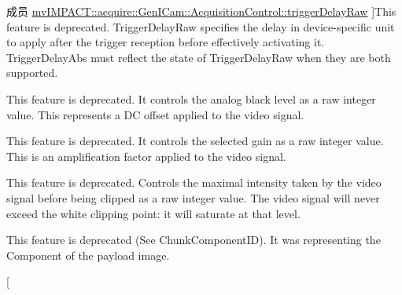 \begin{DoxyRefList}
\hypertarget{deprecated__deprecated000045}{}%
成员 \hyperlink{classmv_i_m_p_a_c_t_1_1acquire_1_1_gen_i_cam_1_1_acquisition_control_ad96d0a854c6dcc41256849ea89d706d3}{mv\+I\+M\+P\+A\+C\+T\+:\+:acquire\+:\+:Gen\+I\+Cam\+:\+:Acquisition\+Control\+:\+:trigger\+Delay\+Raw} ]This feature is deprecated. Trigger\+Delay\+Raw specifies the delay in device-\/specific unit to apply after the trigger reception before effectively activating it. Trigger\+Delay\+Abs must reflect the state of Trigger\+Delay\+Raw when they are both supported.  
\item[\label{deprecated__deprecated000049}%
\hypertarget{deprecated__deprecated000049}{}%
成员 \hyperlink{classmv_i_m_p_a_c_t_1_1acquire_1_1_gen_i_cam_1_1_analog_control_a35d90d2341a108de88e058d69a1ad1d1}{mv\+I\+M\+P\+A\+C\+T\+:\+:acquire\+:\+:Gen\+I\+Cam\+:\+:Analog\+Control\+:\+:black\+Level\+Raw} ]This feature is deprecated. It controls the analog black level as a raw integer value. This represents a D\+C offset applied to the video signal.  
\item[\label{deprecated__deprecated000048}%
\hypertarget{deprecated__deprecated000048}{}%
成员 \hyperlink{classmv_i_m_p_a_c_t_1_1acquire_1_1_gen_i_cam_1_1_analog_control_ade519853cab79cfd6c2ac5564d9ed568}{mv\+I\+M\+P\+A\+C\+T\+:\+:acquire\+:\+:Gen\+I\+Cam\+:\+:Analog\+Control\+:\+:gain\+Raw} ]This feature is deprecated. It controls the selected gain as a raw integer value. This is an amplification factor applied to the video signal.  
\item[\label{deprecated__deprecated000050}%
\hypertarget{deprecated__deprecated000050}{}%
成员 \hyperlink{classmv_i_m_p_a_c_t_1_1acquire_1_1_gen_i_cam_1_1_analog_control_a13f11756bb1316dd7b7e518898767527}{mv\+I\+M\+P\+A\+C\+T\+:\+:acquire\+:\+:Gen\+I\+Cam\+:\+:Analog\+Control\+:\+:white\+Clip\+Raw} ]This feature is deprecated. Controls the maximal intensity taken by the video signal before being clipped as a raw integer value. The video signal will never exceed the white clipping point\+: it will saturate at that level.  
\item[\label{deprecated__deprecated000055}%
\hypertarget{deprecated__deprecated000055}{}%
成员 \hyperlink{classmv_i_m_p_a_c_t_1_1acquire_1_1_gen_i_cam_1_1_chunk_data_control_a0abd13d321577a5794abad963840cc6c}{mv\+I\+M\+P\+A\+C\+T\+:\+:acquire\+:\+:Gen\+I\+Cam\+:\+:Chunk\+Data\+Control\+:\+:chunk\+Image\+Component} ]This feature is deprecated (See Chunk\+Component\+I\+D). It was representing the Component of the payload image. 
\item[\label{deprecated__deprecated000056}%

\end{DoxyRefList}
